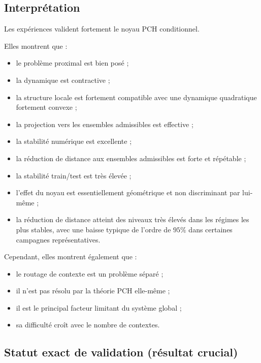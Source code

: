 \documentclass[11pt,a4paper]{article}
\newcommand{\1}{\mathbf 1}
\begin{document}
\subsection{Interprétation}

Les expériences valident fortement le noyau PCH conditionnel.

Elles montrent que :

\begin{itemize}[leftmargin=2em]
\item le problème proximal est bien posé ;
\item la dynamique est contractive ;
\item la structure locale est fortement compatible avec une dynamique quadratique fortement convexe ;
\item la projection vers les ensembles admissibles est effective ;
\item la stabilité numérique est excellente ;
\item la réduction de distance aux ensembles admissibles est forte et répétable ;
\item la stabilité train/test est très élevée ;
\item l’effet du noyau est essentiellement géométrique et non discriminant par lui-même ;
\item la réduction de distance atteint des niveaux très élevés dans les régimes les plus stables, avec une baisse typique de l’ordre de \(95\%\) dans certaines campagnes représentatives.
\end{itemize}

Cependant, elles montrent également que :

\begin{itemize}[leftmargin=2em]
\item le routage de contexte est un problème séparé ;
\item il n’est pas résolu par la théorie PCH elle-même ;
\item il est le principal facteur limitant du système global ;
\item sa difficulté croît avec le nombre de contextes.
\end{itemize}

\subsection{Statut exact de validation (résultat crucial)}
\end{document}
